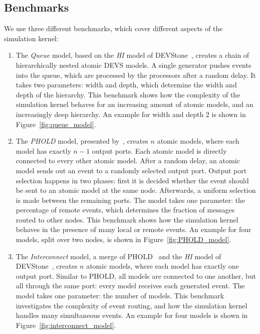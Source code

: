 \subsection{Benchmarks}
We use three different benchmarks, which cover different aspects of the simulation kernel:
\begin{enumerate}
    \item The \textit{Queue} model, based on the \textit{HI} model of DEVStone~\cite{DEVStone}, creates a chain of hierarchically nested atomic \textsf{DEVS} models.
          A single generator pushes events into the queue, which are processed by the processors after a random delay.
          It takes two parameters: width and depth, which determine the width and depth of the hierarchy.
          This benchmark shows how the complexity of the simulation kernel behaves for an increasing amount of atomic models, and an increasingly deep hierarchy.
          An example for width and depth 2 is shown in Figure~\ref{fig:queue_model}.

    \item The \textit{PHOLD} model, presented by~\cite{PHOLD}, creates $n$ atomic models, where each model has exactly $n-1$ output ports.
          Each atomic model is directly connected to every other atomic model.
          After a random delay, an atomic model sends out an event to a randomly selected output port.
          Output port selection happens in two phases: first it is decided whether the event should be sent to an atomic model at the same node.
          Afterwards, a uniform selection is made between the remaining ports.
          The model takes one parameter: the percentage of remote events, which determines the fraction of messages routed to other nodes.
          This benchmark shows how the simulation kernel behaves in the presence of many local or remote events.
          An example for four models, split over two nodes, is shown in Figure~\ref{fig:PHOLD_model}.

    \item The \textit{Interconnect} model, a merge of PHOLD~\cite{PHOLD} and the \textit{HI} model of DEVStone~\cite{DEVStone}, creates $n$ atomic models, where each model has exactly one output port.
          Similar to PHOLD, all models are connected to one another, but all through the same port: every model receives each generated event.
          The model takes one parameter: the number of models.
          This benchmark investigates the complexity of event routing, and how the simulation kernel handles many simultaneous events.
          An example for four models is shown in Figure~\ref{fig:interconnect_model}.
\end{enumerate}

